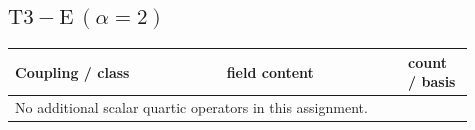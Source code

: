 \documentclass[9pt,a4paper]{article}
\begin{document}
\subsection*{$ \mathrm{T3-E}\,(\alpha=2) $}
\begin{longtable}{@{}p{0.42\linewidth}p{0.36\linewidth}p{0.13\linewidth}@{}}
\toprule
Coupling / class & field content & count / basis\\
\midrule
\endhead
\multicolumn{3}{l}{No additional scalar quartic operators in this assignment.}\\
\bottomrule
\end{longtable}
\end{document}
